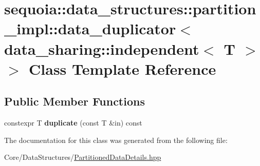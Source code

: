 \hypertarget{classsequoia_1_1data__structures_1_1partition__impl_1_1data__duplicator_3_01data__sharing_1_1independent_3_01_t_01_4_01_4}{}\section{sequoia\+::data\+\_\+structures\+::partition\+\_\+impl\+::data\+\_\+duplicator$<$ data\+\_\+sharing\+::independent$<$ T $>$ $>$ Class Template Reference}
\label{classsequoia_1_1data__structures_1_1partition__impl_1_1data__duplicator_3_01data__sharing_1_1independent_3_01_t_01_4_01_4}
\subsection*{Public Member Functions}
\begin{DoxyCompactItemize}
\item 
\mbox{\label{classsequoia_1_1data__structures_1_1partition__impl_1_1data__duplicator_3_01data__sharing_1_1independent_3_01_t_01_4_01_4_a9a6aa6dae7101f40b4c0367ec2d96936}} 
constexpr T {\bfseries duplicate} (const T \&in) const
\end{DoxyCompactItemize}


The documentation for this class was generated from the following file\+:\begin{DoxyCompactItemize}
\item 
Core/\+Data\+Structures/\mbox{\hyperlink{_partitioned_data_details_8hpp}{Partitioned\+Data\+Details.\+hpp}}\end{DoxyCompactItemize}

